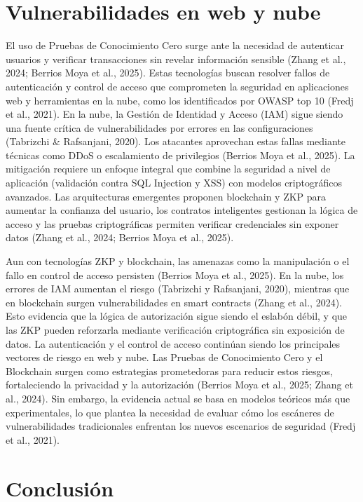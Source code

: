 \documentclass[conference]{IEEEtran}
\begin{document}
\section{Vulnerabilidades en web y nube}
El uso de Pruebas de Conocimiento Cero  surge ante la necesidad de autenticar usuarios y verificar transacciones sin revelar información sensible (Zhang et al., 2024; Berrios Moya et al., 2025). Estas tecnologías buscan resolver fallos de autenticación y control de acceso que comprometen la seguridad en aplicaciones web y herramientas en la nube, como los identificados por OWASP top 10 (Fredj et al., 2021). En la nube, la Gestión de Identidad y Acceso (IAM) sigue siendo una fuente crítica de vulnerabilidades por errores en las configuraciones (Tabrizchi & Rafsanjani, 2020). Los atacantes aprovechan estas fallas mediante técnicas como DDoS o escalamiento de privilegios (Berrios Moya et al., 2025). La mitigación requiere un enfoque integral que combine la seguridad a nivel de aplicación (validación contra SQL Injection y XSS) con modelos criptográficos avanzados. Las arquitecturas emergentes proponen blockchain y ZKP para aumentar la confianza del usuario, los contratos inteligentes gestionan la lógica de acceso y las pruebas criptográficas permiten verificar credenciales sin exponer datos (Zhang et al., 2024; Berrios Moya et al., 2025).


Aun con tecnologías ZKP y blockchain, las amenazas como la manipulación o el fallo en control de acceso persisten (Berrios Moya et al., 2025). En la nube, los errores de IAM aumentan el riesgo (Tabrizchi y Rafsanjani, 2020), mientras que en blockchain surgen vulnerabilidades en smart contracts (Zhang et al., 2024). Esto evidencia que la lógica de autorización sigue siendo el eslabón débil, y que las ZKP pueden reforzarla mediante verificación criptográfica sin exposición de datos. La autenticación y el control de acceso continúan siendo los principales vectores de riesgo en web y nube. Las Pruebas de Conocimiento Cero y el Blockchain surgen como estrategias prometedoras para reducir estos riesgos, fortaleciendo la privacidad y la autorización (Berrios Moya et al., 2025; Zhang et al., 2024). Sin embargo, la evidencia actual se basa en modelos teóricos más que experimentales, lo que plantea la necesidad de evaluar cómo los escáneres de vulnerabilidades tradicionales enfrentan los nuevos escenarios de seguridad (Fredj et al., 2021).

\section{Conclusión}
\end{document}
